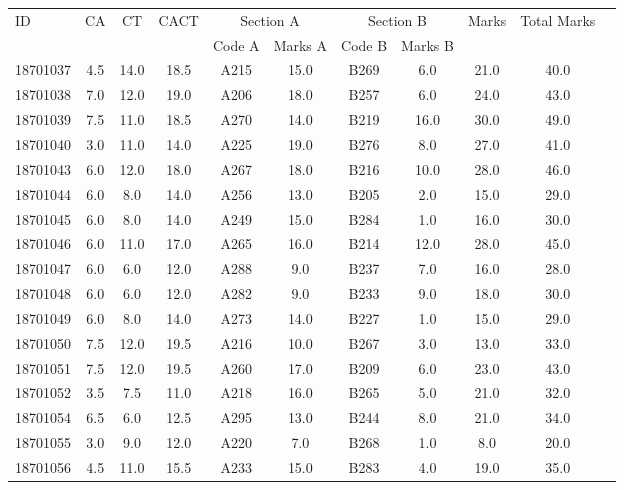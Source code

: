 \documentclass[12pt]{article}
\begin{document}
    \begin{center} 
	\renewcommand{\arraystretch}{1.08}
	\begin{small}
    \begin{tabular}{|l|c|c|c|c|c|c|c|c|c|c|} \hline
	\multirow{2}{*}{ID} & 	\multirow{2}{*}{CA}  & 	\multirow{2}{*}{CT}  & 	\multirow{2}{*}{CACT}  & \multicolumn{2 }{|c|}{Section A}& \multicolumn{2 }{c|}{Section B} & 	\multirow{2}{*}{Marks}  & 	\multirow{2}{*}{Total Marks}  \\ 
	&  &  &  & Code A & Marks A & Code B & Marks B&  &  \\ \hline
18701037 & 4.5 & 14.0 & 18.5 & A215 & 15.0 & B269 & 6.0 & 21.0 & 40.0\\ \hline 
18701038 & 7.0 & 12.0 & 19.0 & A206 & 18.0 & B257 & 6.0 & 24.0 & 43.0\\ \hline 
18701039 & 7.5 & 11.0 & 18.5 & A270 & 14.0 & B219 & 16.0 & 30.0 & 49.0\\ \hline 
18701040 & 3.0 & 11.0 & 14.0 & A225 & 19.0 & B276 & 8.0 & 27.0 & 41.0\\ \hline 
18701043 & 6.0 & 12.0 & 18.0 & A267 & 18.0 & B216 & 10.0 & 28.0 & 46.0\\ \hline 
18701044 & 6.0 & 8.0 & 14.0 & A256 & 13.0 & B205 & 2.0 & 15.0 & 29.0\\ \hline 
18701045 & 6.0 & 8.0 & 14.0 & A249 & 15.0 & B284 & 1.0 & 16.0 & 30.0\\ \hline 
18701046 & 6.0 & 11.0 & 17.0 & A265 & 16.0 & B214 & 12.0 & 28.0 & 45.0\\ \hline 
18701047 & 6.0 & 6.0 & 12.0 & A288 & 9.0 & B237 & 7.0 & 16.0 & 28.0\\ \hline 
18701048 & 6.0 & 6.0 & 12.0 & A282 & 9.0 & B233 & 9.0 & 18.0 & 30.0\\ \hline 
18701049 & 6.0 & 8.0 & 14.0 & A273 & 14.0 & B227 & 1.0 & 15.0 & 29.0\\ \hline 
18701050 & 7.5 & 12.0 & 19.5 & A216 & 10.0 & B267 & 3.0 & 13.0 & 33.0\\ \hline 
18701051 & 7.5 & 12.0 & 19.5 & A260 & 17.0 & B209 & 6.0 & 23.0 & 43.0\\ \hline 
18701052 & 3.5 & 7.5 & 11.0 & A218 & 16.0 & B265 & 5.0 & 21.0 & 32.0\\ \hline 
18701054 & 6.5 & 6.0 & 12.5 & A295 & 13.0 & B244 & 8.0 & 21.0 & 34.0\\ \hline 
18701055 & 3.0 & 9.0 & 12.0 & A220 & 7.0 & B268 & 1.0 & 8.0 & 20.0\\ \hline 
18701056 & 4.5 & 11.0 & 15.5 & A233 & 15.0 & B283 & 4.0 & 19.0 & 35.0\\ \hline 

\end{tabular}
\end{small}
\end{center}
\end{document}

